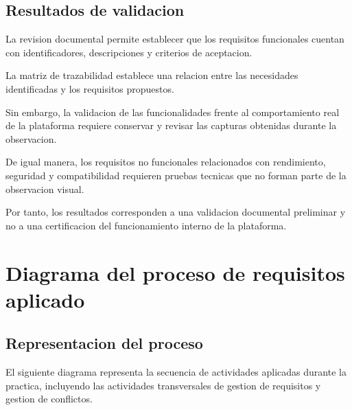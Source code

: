 \documentclass[11pt,a4paper]{article}
\begin{document}
\subsection{Resultados de validacion}

La revision documental permite establecer que
los requisitos funcionales cuentan con identificadores,
descripciones y criterios de aceptacion.

La matriz de trazabilidad establece una relacion
entre las necesidades identificadas y los requisitos
propuestos.

Sin embargo, la validacion de las funcionalidades
frente al comportamiento real de la plataforma
requiere conservar y revisar las capturas obtenidas
durante la observacion.

De igual manera, los requisitos no funcionales
relacionados con rendimiento, seguridad y
compatibilidad requieren pruebas tecnicas
que no forman parte de la observacion visual.

Por tanto, los resultados corresponden a una
validacion documental preliminar y no a una
certificacion del funcionamiento interno
de la plataforma.

\section{Diagrama del proceso de requisitos aplicado}

\subsection{Representacion del proceso}

El siguiente diagrama representa la secuencia
de actividades aplicadas durante la practica,
incluyendo las actividades transversales de
gestion de requisitos y gestion de conflictos.
\end{document}
